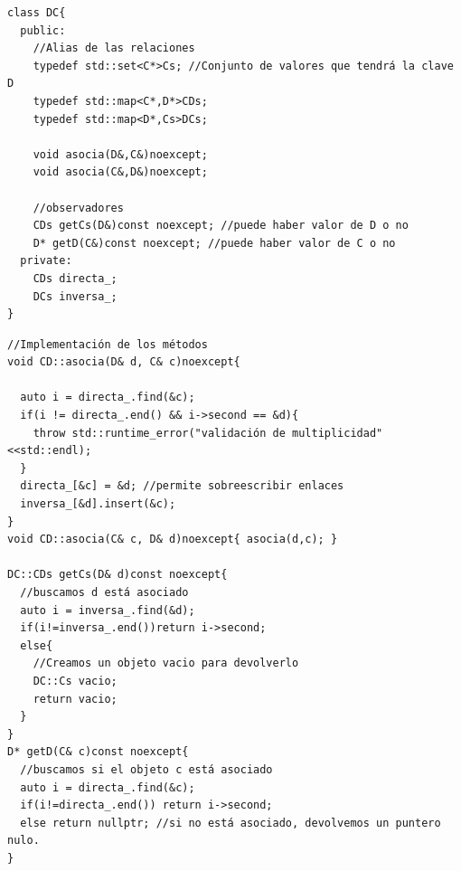 \begin{verbatim}
class DC{
  public:
    //Alias de las relaciones 
    typedef std::set<C*>Cs; //Conjunto de valores que tendrá la clave D
    typedef std::map<C*,D*>CDs;
    typedef std::map<D*,Cs>DCs;
    
    void asocia(D&,C&)noexcept;
    void asocia(C&,D&)noexcept;

    //observadores
    CDs getCs(D&)const noexcept; //puede haber valor de D o no
    D* getD(C&)const noexcept; //puede haber valor de C o no
  private:
    CDs directa_;
    DCs inversa_;
}
\end{verbatim}
\begin{verbatim}
//Implementación de los métodos
void CD::asocia(D& d, C& c)noexcept{
  
  auto i = directa_.find(&c);
  if(i != directa_.end() && i->second == &d){
    throw std::runtime_error("validación de multiplicidad"<<std::endl);
  }
  directa_[&c] = &d; //permite sobreescribir enlaces
  inversa_[&d].insert(&c);
}
void CD::asocia(C& c, D& d)noexcept{ asocia(d,c); }

DC::CDs getCs(D& d)const noexcept{
  //buscamos d está asociado
  auto i = inversa_.find(&d);
  if(i!=inversa_.end())return i->second;
  else{
    //Creamos un objeto vacio para devolverlo
    DC::Cs vacio;
    return vacio;
  }
}
D* getD(C& c)const noexcept{
  //buscamos si el objeto c está asociado
  auto i = directa_.find(&c);
  if(i!=directa_.end()) return i->second;
  else return nullptr; //si no está asociado, devolvemos un puntero nulo.
}
\end{verbatim}

